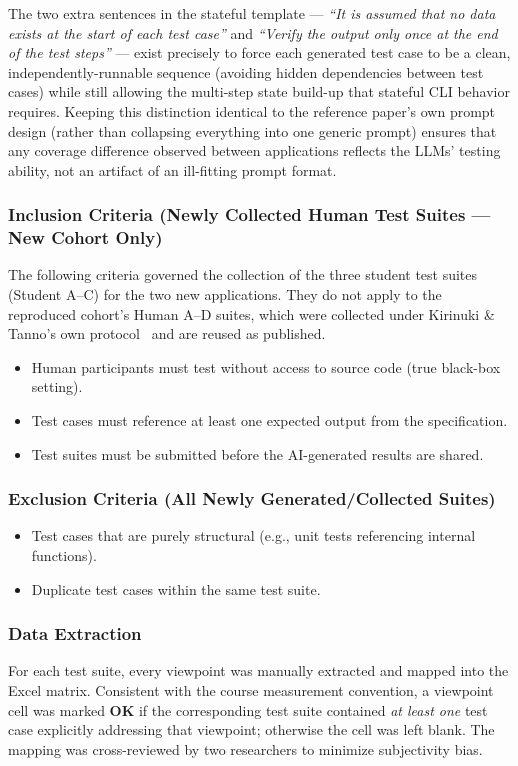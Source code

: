 \documentclass[12pt,a4paper]{article}
\begin{document}
The two extra sentences in the stateful template --- \textit{``It is assumed that no data exists at the start of each test case''} and \textit{``Verify the output only once at the end of the test steps''} --- exist precisely to force each generated test case to be a clean, independently-runnable sequence (avoiding hidden dependencies between test cases) while still allowing the multi-step state build-up that stateful CLI behavior requires. Keeping this distinction identical to the reference paper's own prompt design (rather than collapsing everything into one generic prompt) ensures that any coverage difference observed between applications reflects the LLMs' testing ability, not an artifact of an ill-fitting prompt format.

\subsubsection*{Inclusion Criteria (Newly Collected Human Test Suites --- New Cohort Only)}
The following criteria governed the collection of the three student test suites (Student A--C) for the two new applications. They do not apply to the reproduced cohort's Human A--D suites, which were collected under Kirinuki \& Tanno's own protocol~\cite{b1} and are reused as published.
\begin{itemize}[leftmargin=1.2cm]
    \item Human participants must test without access to source code (true black-box setting).
    \item Test cases must reference at least one expected output from the specification.
    \item Test suites must be submitted before the AI-generated results are shared.
\end{itemize}

\subsubsection*{Exclusion Criteria (All Newly Generated/Collected Suites)}
\begin{itemize}[leftmargin=1.2cm]
    \item Test cases that are purely structural (e.g., unit tests referencing internal functions).
    \item Duplicate test cases within the same test suite.
\end{itemize}

\subsubsection*{Data Extraction}
For each test suite, every viewpoint was manually extracted and mapped into the Excel matrix. Consistent with the course measurement convention, a viewpoint cell was marked \textbf{OK} if the corresponding test suite contained \emph{at least one} test case explicitly addressing that viewpoint; otherwise the cell was left blank. The mapping was cross-reviewed by two researchers to minimize subjectivity bias.
\end{document}

